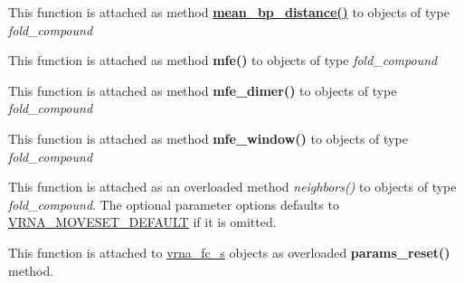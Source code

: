 \begin{DoxyRefList}
\item[\label{wrappers__wrappers000091}%
\Hypertarget{wrappers__wrappers000091}%
Global \hyperlink{group__part__func__global_gaa6b8983b559b9ef4b2e1b31113ea317b}{vrna\+\_\+mean\+\_\+bp\+\_\+distance} (vrna\+\_\+fold\+\_\+compound\+\_\+t $\ast$vc)]This function is attached as method {\bfseries \hyperlink{group__part__func__global__deprecated_ga79cbc375af65f11609feb6b055269e7d}{mean\+\_\+bp\+\_\+distance()}} to objects of type {\itshape fold\+\_\+compound}  
\item[\label{wrappers__wrappers000080}%
\Hypertarget{wrappers__wrappers000080}%
Global \hyperlink{group__mfe__global_gabd3b147371ccf25c577f88bbbaf159fd}{vrna\+\_\+mfe} (vrna\+\_\+fold\+\_\+compound\+\_\+t $\ast$vc, char $\ast$structure)]This function is attached as method {\bfseries mfe()} to objects of type {\itshape fold\+\_\+compound}  
\item[\label{wrappers__wrappers000081}%
\Hypertarget{wrappers__wrappers000081}%
Global \hyperlink{group__mfe__global_gaab22d10c1190f205f16a77cab9d5d3ee}{vrna\+\_\+mfe\+\_\+dimer} (vrna\+\_\+fold\+\_\+compound\+\_\+t $\ast$vc, char $\ast$structure)]This function is attached as method {\bfseries mfe\+\_\+dimer()} to objects of type {\itshape fold\+\_\+compound}  
\item[\label{wrappers__wrappers000082}%
\Hypertarget{wrappers__wrappers000082}%
Global \hyperlink{group__mfe__window_ga689df235a1915a1ad56e377383c044ce}{vrna\+\_\+mfe\+\_\+window} (vrna\+\_\+fold\+\_\+compound\+\_\+t $\ast$vc, F\+I\+LE $\ast$file)]This function is attached as method {\bfseries mfe\+\_\+window()} to objects of type {\itshape fold\+\_\+compound}  
\item[\label{wrappers__wrappers000084}%
\Hypertarget{wrappers__wrappers000084}%
Global \hyperlink{group__neighbors_gab1473d856b15da2120fe648977798ad5}{vrna\+\_\+neighbors} (vrna\+\_\+fold\+\_\+compound\+\_\+t $\ast$vc, const short $\ast$pt, unsigned int options)]This function is attached as an overloaded method {\itshape neighbors()} to objects of type {\itshape fold\+\_\+compound}. The optional parameter {\ttfamily options} defaults to \hyperlink{group__neighbors_gaa5ffec4dd0d02df320f123e6888154d1}{V\+R\+N\+A\+\_\+\+M\+O\+V\+E\+S\+E\+T\+\_\+\+D\+E\+F\+A\+U\+LT} if it is omitted.  
\item[\label{wrappers__wrappers000087}%
\Hypertarget{wrappers__wrappers000087}%
Global \hyperlink{group__energy__parameters_gac40dc82e48a72a97cfc58b9da08a7792}{vrna\+\_\+params\+\_\+reset} (vrna\+\_\+fold\+\_\+compound\+\_\+t $\ast$vc, vrna\+\_\+md\+\_\+t $\ast$md\+\_\+p)]This function is attached to \hyperlink{group__fold__compound_structvrna__fc__s}{vrna\+\_\+fc\+\_\+s} objects as overloaded {\bfseries params\+\_\+reset()} method.


\end{DoxyRefList}
